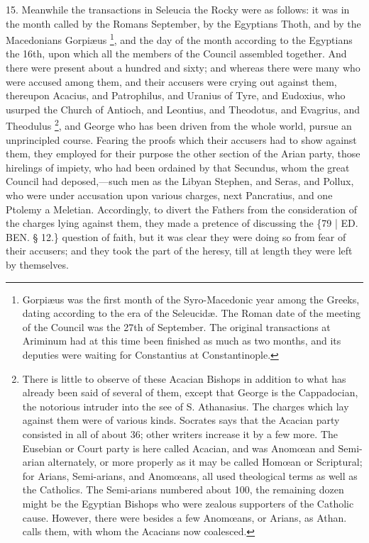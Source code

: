 15. Meanwhile the transactions
in Seleucia the Rocky were as follows: it was in the month called by
the Romans September, by the Egyptians Thoth, and by the Macedonians
Gorpiæus \footnote{Gorpiæus was the first month of the Syro-Macedonic year among the
Greeks, dating according to the era of the Seleucidæ. The Roman date
of the meeting of the Council was the 27th of September. The original
transactions at Ariminum had at this time been finished as much as two
months, and its deputies were waiting for Constantius at
Constantinople.}, and
the day of the month according to the Egyptians the 16th, upon which
all the members of the Council assembled together. And there were
present about a hundred and sixty; and whereas there were many who
were accused among them, and their accusers were crying out against
them, thereupon Acacius, and Patrophilus, and Uranius of Tyre, and
Eudoxius, who usurped the Church of Antioch, and Leontius, and
Theodotus, and Evagrius, and Theodulus \footnote{There is little to observe of these Acacian Bishops in addition to
what has already been said of several of them, except that George is
the Cappadocian, the notorious intruder into the see of S. Athanasius.
The charges which lay against them were of various kinds. Socrates
says that the Acacian party consisted in all of about 36; other
writers increase it by a few more. The Eusebian or Court party is here
called Acacian, and was Anomœan and Semi-arian alternately, or more
properly as it may be called Homœan or Scriptural; for Arians, Semi-arians,
and Anomœans, all used theological terms as well as the Catholics.
The Semi-arians numbered about 100, the remaining dozen might be the
Egyptian Bishops who were zealous supporters of the Catholic cause.
However, there were besides a few Anomœans, or Arians, as Athan.
calls them, with whom the Acacians now coalesced.}, and George who has been driven from the whole world, pursue
an unprincipled course. Fearing the proofs which their accusers had to
show against them, they employed for their purpose the other section
of the Arian party, those hirelings of impiety, who had been ordained
by that Secundus, whom the great Council had deposed,—such men as
the Libyan Stephen, and Seras, and Pollux, who were under accusation
upon various charges, next Pancratius, and one Ptolemy a Meletian.
Accordingly, to divert the Fathers from the consideration of the
charges lying against them, they made a pretence of discussing the \{79
| ED.
BEN. § 12.\} question of faith, but it was
clear they were doing so from fear of their accusers; and they took
the part of the heresy, till at length they were left by themselves.
